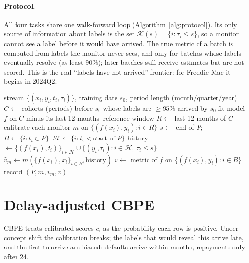 \documentclass[11pt]{article}
\begin{document}
\paragraph{Protocol.} All four tasks share one walk-forward loop (Algorithm~\ref{alg:protocol}).
Its only source of information about labels is the set $\mathcal{K}(s) = \{i : \tau_i \le s\}$, so
a monitor cannot see a label before it would have arrived. The true metric of a batch is computed
from labels the monitor never sees, and only for batches whose labels eventually resolve (at
least 90\%); later batches still receive estimates but are not scored. This is the real
``labels have not arrived'' frontier: for Freddie Mac it begins in 2024Q2.

\begin{algorithm}[t]
\caption{Walk-forward evaluation shared by all tasks}
\label{alg:protocol}
\begin{algorithmic}[1]
\Require stream $\{(x_i, y_i, t_i, \tau_i)\}$, training date $s_0$, period length (month/quarter/year)
\State $C \gets$ cohorts (periods) before $s_0$ whose labels are $\ge 95\%$ arrived by $s_0$
\State fit model $f$ on $C$ minus its last 12 months; reference window $R \gets$ last 12 months of $C$
\State calibrate each monitor $m$ on $\{(f(x_i), y_i) : i \in R\}$
  \State $s \gets$ end of $P$; \quad $B \gets \{i : t_i \in P\}$; \quad $\mathcal{H} \gets \{i : t_i < \text{start of } P\}$
  \State history $\gets \{(f(x_i), t_i)\}_{i \in \mathcal{H}} \cup \{(y_i, \tau_i) : i \in \mathcal{H},\ \tau_i \le s\}$
  \State $\hat{v}_m \gets m(\{f(x_i), x_i\}_{i \in B}, \text{history})$ 
    \State $v \gets$ metric of $f$ on $\{(f(x_i), y_i) : i \in B\}$ 
    \State record $(P, m, \hat{v}_m, v)$
  \EndIf
\EndFor
\end{algorithmic}
\end{algorithm}

\section{Delay-adjusted CBPE}\label{sec:method}

CBPE treats calibrated scores $c_i$ as the probability each row is positive. Under concept
shift the calibration breaks; the labels that would reveal this arrive late, and the first to
arrive are biased: defaults arrive within months, repayments only after 24.
\end{document}
